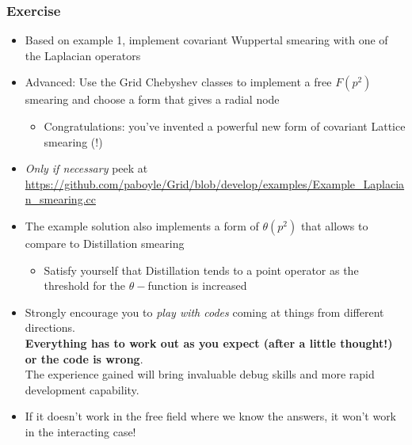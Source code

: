 \documentclass[pdf,ps,8pt]{beamer}
\begin{document}
\begin{frame}[fragile]\small\frametitle{ Exercise}

\begin{itemize}
\item Based on example 1, implement covariant Wuppertal smearing with one of the Laplacian operators 
\item Advanced: Use the Grid Chebyshev classes to implement a free $F(p^2)$ smearing and choose a form that gives a radial node
  \begin{itemize}
  \item Congratulations: you've invented a powerful new form of covariant Lattice smearing (!)
\end{itemize}
\item \emph{Only if necessary} peek at
  \href{https://github.com/paboyle/Grid/blob/develop/examples/Example_Laplacian_smearing.cc}{\color{blue}https://github.com/paboyle/Grid/blob/develop/examples/Example\_Laplacian\_smearing.cc}
\item The example solution also implements a form of $\theta(p^2)$ that allows to compare to Distillation smearing
\begin{itemize}
\item Satisfy yourself that Distillation tends to a point operator as the threshold for the $\theta-$function is increased
\end{itemize}
\item Strongly encourage you to \emph{play with codes} coming at things from different directions. \\
  {\bf Everything has to work out as you expect (after a little thought!) or the code is wrong}. \\
  The experience gained will bring invaluable debug skills and more rapid development capability.
\item If it doesn't work in the free field where we know the answers, it won't work in the interacting case!
\end{itemize}

\end{frame}
  
\end{document}
